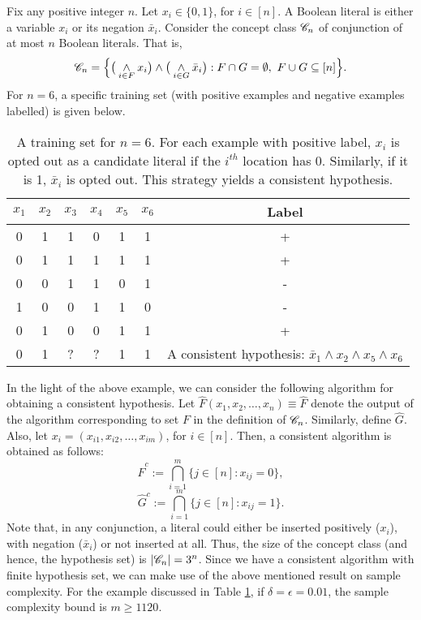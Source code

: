 \documentclass[a4paper,english,12pt]{article}
\begin{document}
\begin{exmp}
Fix  any positive integer $n$. Let $x_i\in\{0,1\}$, for $i\in[n]$. A Boolean literal is either a variable $x_i$ or its negation $\bar{x}_i$. Consider the concept class $\mathscr{C}_n$ of conjunction of at most $n$ Boolean literals. That is, $$\mathscr{C}_n=\Big\{\big(\underset{i\in F}\wedge x_i\big)\wedge \big(\underset{i\in G}\wedge \bar{x}_i\big):F\cap G=\emptyset,~F\cup G \subseteq [n]\Big\}.$$ For $n=6$, a specific training set (with positive examples and negative examples labelled) is given below. 
\begin{center}
\begin{table}[h!]
\centering
\begin{tabular}{ |c|c|c|c|c|c|c| } 
 \hline
 $x_1$ & $x_2$ & $x_3$ & $x_4$ & $x_5$ & $x_6$ & Label \\
 \hline
 \hline
 0 & 1 & 1 & 0 & 1 & 1 & + \\ 
  \hline 
 0 & 1 & 1 & 1 & 1 & 1 & +\\ 
  \hline 
 0 & 0 & 1 & 1 & 0 & 1 & -\\ 
  \hline 
 1 & 0 & 0 & 1 & 1 & 0 & -\\ 
  \hline 
 0 & 1 & 0 & 0 & 1 & 1 & +\\
 \hline
 \hline
  0 & 1 & ? & ? & 1 & 1 & A consistent hypothesis: $\bar{x}_1\wedge x_2\wedge x_5 \wedge x_6$ \\ 
 \hline
\end{tabular}
\caption{A training set for $n=6$. For each example with positive label, $x_i$ is opted out as a candidate literal  if the $i^{th}$ location has 0. Similarly, if it is 1, $\bar{x}_i$ is opted out. This strategy yields a consistent hypothesis.}
\label{Table_Boolean_Lit}
\end{table}
\end{center}
In the light of the above example, we can consider the following algorithm for obtaining a consistent hypothesis. Let $ \hat{F}(x_1,x_2,\hdots,x_n)\equiv \hat{F}$ denote the output of the algorithm corresponding to set $F$ in the definition of $\mathscr{C}_n$. Similarly, define $\hat{G}$. Also, let $x_i=(x_{i1},x_{i2},\hdots,x_{im})$, for $i\in[n]$. Then, a consistent algorithm is obtained as follows: $$\hat{F}^c:=\bigcap_{i=1}^{m}\big\{j\in[n]: x_{ij}=0\big\},$$ $$\hat{G}^c:=\bigcap_{i=1}^{m}\big\{j\in[n]: x_{ij}=1\big\}.$$
 Note that, in any conjunction, a literal could either be inserted positively ($x_i$), with negation ($\bar{x}_i$) or not inserted at all. Thus, the size of the concept class (and hence,  the hypothesis set) is $|\mathscr{C}_n|=3^n$. Since we have a consistent algorithm with finite hypothesis set, we can make use of the above mentioned result on sample complexity. For the example discussed in Table \ref{Table_Boolean_Lit}, if $\delta=\epsilon=0.01$, the sample complexity bound is $m\geq 1120$.
\end{exmp}
\end{document}

